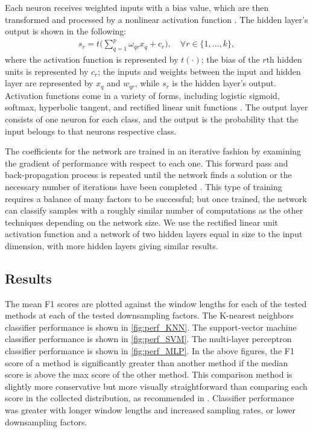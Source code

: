 Each neuron receives weighted inputs with a bias value, which are then 
transformed and processed by a nonlinear activation function \cite{montesinos2022fundamentals}. 
The hidden layer's output is shown in the following:
\begin{align}
s_r = t \bigg( \sum_{q=1}^p \omega_{qr} x_q + c_r \bigg), \quad \forall r \in \{1, \ldots, k\},
\label{eq:layer}
\end{align}
where the activation function is represented by $t(\cdot)$; 
the bias of the $r$th hidden units is represented by $c_r$; 
the inputs and weights between the input and hidden layer are represented 
by $x_q$ and $w_{qr}$, while $s_r$ is the hidden layer's output. 
Activation functions come in a variety of forms, including logistic sigmoid, softmax, 
hyperbolic tangent, and rectified linear unit functions \cite{sharma2017activation}. 
The output layer consists of one neuron for each class, and the output is the
probability that the input belongs to that neurons respective class.

The coefficients for the network are trained in an iterative fashion by examining 
the gradient of performance with respect to each one.
This forward pass and back-propagation process is repeated until the network finds 
a solution or the necessary number of iterations have been completed \cite{maxwell2017deep}.
This type of training requires a balance of many factors to be successful; but once trained,
the network can classify samples with a roughly similar number of computations as the other
techniques depending on the network size.
We use the rectified linear unit activation function and a network of two hidden layers 
equal in size to the input dimension, with more hidden layers giving similar results.

\subsection{Results}

The mean F1 scores are plotted against the window lengths for each of the tested methods 
at each of the tested downsampling factors.
The K-nearest neighbors classifier performance is shown in \ref{fig:perf_KNN}.
The support-vector machine classifier performance is shown in \ref{fig:perf_SVM}.
The multi-layer perceptron classifier performance is shown in \ref{fig:perf_MLP}.
In the above figures, the F1 score of a method is significantly greater than another method
if the median score is above the max score of the other method.
This comparison method is slightly more conservative but more visually straightforward
than comparing each score in the collected distribution,
as recommended in \cite{Goutte2005}.
Classifier performance was greater with longer window lengths and 
increased sampling rates, or lower downsampling factors.

